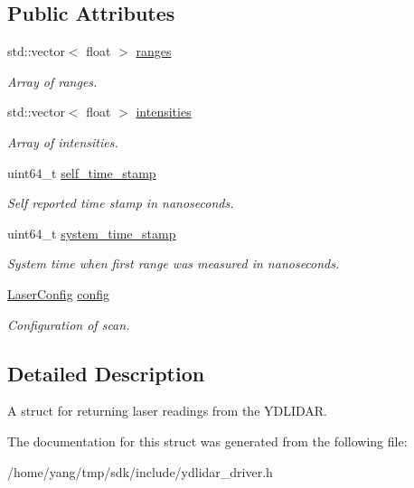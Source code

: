 \subsection*{Public Attributes}
\begin{DoxyCompactItemize}
\item 
std\+::vector$<$ float $>$ \hyperlink{struct_laser_scan_a4d059cb77f0f9f6e558db50c9993f7df}{ranges}\hypertarget{struct_laser_scan_a4d059cb77f0f9f6e558db50c9993f7df}{}\label{struct_laser_scan_a4d059cb77f0f9f6e558db50c9993f7df}

\begin{DoxyCompactList}\small\item\em Array of ranges. \end{DoxyCompactList}\item 
std\+::vector$<$ float $>$ \hyperlink{struct_laser_scan_a6e68040137d787ef7ef47580d147c503}{intensities}\hypertarget{struct_laser_scan_a6e68040137d787ef7ef47580d147c503}{}\label{struct_laser_scan_a6e68040137d787ef7ef47580d147c503}

\begin{DoxyCompactList}\small\item\em Array of intensities. \end{DoxyCompactList}\item 
uint64\+\_\+t \hyperlink{struct_laser_scan_ad37e2a54c7eff58cad7576d51916b859}{self\+\_\+time\+\_\+stamp}\hypertarget{struct_laser_scan_ad37e2a54c7eff58cad7576d51916b859}{}\label{struct_laser_scan_ad37e2a54c7eff58cad7576d51916b859}

\begin{DoxyCompactList}\small\item\em Self reported time stamp in nanoseconds. \end{DoxyCompactList}\item 
uint64\+\_\+t \hyperlink{struct_laser_scan_a1bb6b997ce698fbc516bc20ab3ba3399}{system\+\_\+time\+\_\+stamp}\hypertarget{struct_laser_scan_a1bb6b997ce698fbc516bc20ab3ba3399}{}\label{struct_laser_scan_a1bb6b997ce698fbc516bc20ab3ba3399}

\begin{DoxyCompactList}\small\item\em System time when first range was measured in nanoseconds. \end{DoxyCompactList}\item 
\hyperlink{struct_laser_config}{Laser\+Config} \hyperlink{struct_laser_scan_a5c7dd0b85432e62cf319f2ad4ec058b4}{config}\hypertarget{struct_laser_scan_a5c7dd0b85432e62cf319f2ad4ec058b4}{}\label{struct_laser_scan_a5c7dd0b85432e62cf319f2ad4ec058b4}

\begin{DoxyCompactList}\small\item\em Configuration of scan. \end{DoxyCompactList}\end{DoxyCompactItemize}


\subsection{Detailed Description}
A struct for returning laser readings from the Y\+D\+L\+I\+D\+AR. 

The documentation for this struct was generated from the following file\+:\begin{DoxyCompactItemize}
\item 
/home/yang/tmp/sdk/include/ydlidar\+\_\+driver.\+h\end{DoxyCompactItemize}
